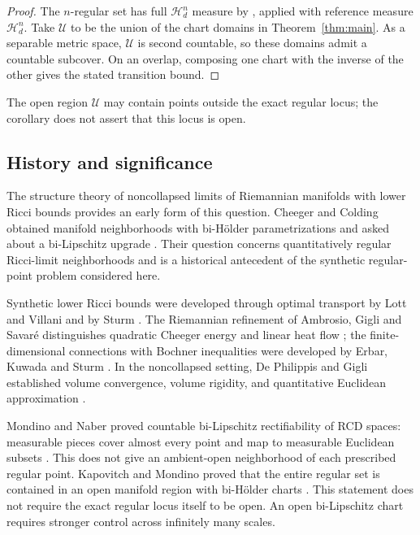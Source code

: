 \begin{proof}
The \(n\)-regular set has full \(\mathcal H_d^n\) measure by
\cite[Theorem~1.12(ii),(vi)]{DPG18}, applied with reference measure
\(\mathcal H_d^n\). Take \(\mathcal U\) to be the union of the chart
domains in Theorem~\ref{thm:main}. As a separable metric space,
\(\mathcal U\) is second countable, so these domains admit a
countable subcover. On an overlap, composing one chart with the
inverse of the other gives the stated transition bound.
\end{proof}

The open region \(\mathcal U\) may contain points outside the exact
regular locus; the corollary does not assert that this locus is open.

\subsection{History and significance}

The structure theory of noncollapsed limits of Riemannian manifolds
with lower Ricci bounds provides an early form of this question.
Cheeger and Colding obtained manifold neighborhoods with bi-H\"older
parametrizations and asked about a bi-Lipschitz upgrade
\cite[Theorem~5.14 and Remark~5.15]{CC97}. Their question concerns
quantitatively regular Ricci-limit neighborhoods and is a historical
antecedent of the synthetic regular-point problem considered here.

Synthetic lower Ricci bounds were developed through optimal transport
by Lott and Villani and by Sturm \cite{LV09,Sturm06II}. The
Riemannian refinement of Ambrosio, Gigli and Savar\'e distinguishes
quadratic Cheeger energy and linear heat flow \cite{AGS14}; the
finite-dimensional connections with Bochner inequalities were
developed by Erbar, Kuwada and Sturm \cite{EKS15}. In the noncollapsed
setting, De Philippis and Gigli established volume convergence,
volume rigidity, and quantitative Euclidean approximation
\cite{DPG18}.

Mondino and Naber proved countable bi-Lipschitz rectifiability of
RCD spaces: measurable pieces cover almost every point and map to
measurable Euclidean subsets \cite[Theorem~1.1]{MN19}. This does not
give an ambient-open neighborhood of each prescribed regular point.
Kapovitch and Mondino proved that the entire regular set is contained
in an open manifold region with bi-H\"older charts
\cite[Theorem~3.1 and Corollary~3.2]{KM21}. This statement does not
require the exact regular locus itself to be open. An open
bi-Lipschitz chart requires stronger control across infinitely many
scales.

